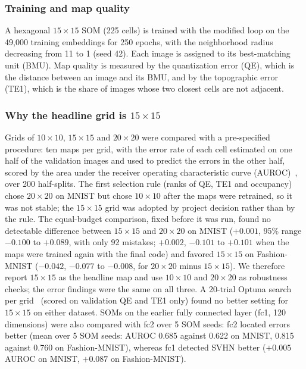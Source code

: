 \documentclass[preprint,review,12pt]{elsarticle}
\begin{document}
\subsubsection{Training and map quality}
A hexagonal $15\times15$ SOM (225 cells) is trained with the modified loop on the 49,000 training embeddings for 250 epochs, with the neighborhood radius decreasing from 11 to 1 (seed 42). Each image is assigned to its best-matching unit (BMU). Map quality is measured by the quantization error (QE), which is the distance between an image and its BMU, and by the topographic error (TE1), which is the share of images whose two closest cells are not adjacent.

\subsubsection{Why the headline grid is $15\times15$}
Grids of $10\times10$, $15\times15$ and $20\times20$ were compared with a pre-specified procedure: ten maps per grid, with the error rate of each cell estimated on one half of the validation images and used to predict the errors in the other half, scored by the area under the receiver operating characteristic curve (AUROC)~\cite{fawcett2006roc}, over 200 half-splits. The first selection rule (ranks of QE, TE1 and occupancy) chose $20\times20$ on MNIST but chose $10\times10$ after the maps were retrained, so it was not stable; the $15\times15$ grid was adopted by project decision rather than by the rule. The equal-budget comparison, fixed before it was run, found no detectable difference between $15\times15$ and $20\times20$ on MNIST ($+0.001$, 95\% range $-0.100$ to $+0.089$, with only 92 mistakes; $+0.002$, $-0.101$ to $+0.101$ when the maps were trained again with the final code) and favored $15\times15$ on Fashion-MNIST ($-0.042$, $-0.077$ to $-0.008$, for $20\times20$ minus $15\times15$). We therefore report $15\times15$ as the headline map and use $10\times10$ and $20\times20$ as robustness checks; the error findings were the same on all three. A 20-trial Optuna search per grid~\cite{akiba2019optuna} (scored on validation QE and TE1 only) found no better setting for $15\times15$ on either dataset. SOMs on the earlier fully connected layer (fc1, 120 dimensions) were also compared with fc2 over 5 SOM seeds: fc2 located errors better (mean over 5 SOM seeds: AUROC 0.685 against 0.622 on MNIST, 0.815 against 0.760 on Fashion-MNIST), whereas fc1 detected SVHN better ($+0.005$ AUROC on MNIST, $+0.087$ on Fashion-MNIST).
\end{document}
